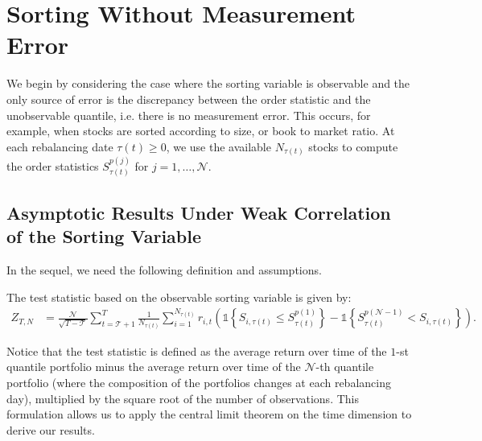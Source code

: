 \section{Sorting Without Measurement Error}
\label{Sorting Without Measurement Error}

We begin by considering the case where the sorting variable is observable and the only source of error is the discrepancy between the order statistic and the unobservable quantile, i.e. there is no measurement error. This occurs, for example, when stocks are sorted according to size, or book to market ratio. At each rebalancing date $\tau(t) \geq 0$, we use the available $N_{\tau(t)}$ stocks to compute the order statistics $S_{\tau(t)}^{p(j)}$ for $j=1,\ldots, \mathcal{N}$. 

\subsection{Asymptotic Results Under Weak Correlation of the Sorting Variable}

In the sequel, we need the following definition and assumptions. 

\begin{definition}
\label{def: Zeta}
The test statistic based on the observable sorting variable is given by:
\begin{align*}
    Z_{T,N} &= \frac{\mathcal{N}}{\sqrt{T-\mathcal{T} }} \sum_{t=\mathcal{T} + 1}^{T} \frac{1}{ N_{\tau(t)}} \sum_{i=1}^{N_{\tau(t)}} r_{i,t}\left( \mathds{1} \left\{ S_{i,\tau(t)} \leq S_{\tau(t)}^{p(1)} \right\}  - \mathds{1} \left\{ S_{\tau(t)}^{p(\mathcal{N}-1) } < S_{i,\tau(t)} \right\} \right).
\end{align*}
\end{definition}

\noindent
Notice that the test statistic is defined as the average return over time of the $1$-st quantile portfolio minus the average return over time of the $\mathcal{N}$-th quantile portfolio (where the composition of the portfolios changes at each rebalancing day), multiplied by the square root of the number of observations. This formulation allows us to apply the central limit theorem on the time dimension to derive our results.

